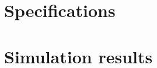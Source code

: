 \section{Specifications}
\label{sec:specs}

\section{Simulation results}
\label{sec:simulation-results}
